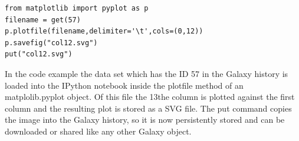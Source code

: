 \documentclass{bioinfo}
\begin{document}
\begin{methods}
\begin{lstlisting}[frame=single]
from matplotlib import pyplot as p
filename = get(57)
p.plotfile(filename,delimiter='\t',cols=(0,12))
p.savefig("col12.svg")
put("col12.svg")
\end{lstlisting}
In the code example the data set which has the ID 57 in the Galaxy history is loaded into the IPython notebook inside the plotfile method of an matplolib.pyplot object. Of this file the 13the column is plotted against the first column and the resulting plot is stored as a SVG file. The put command copies the image into the Galaxy history, so it is now persistently stored and can be downloaded or shared like any other Galaxy object. 



%
%
%
%
%
%
%
%
%
%



\end{methods}
\end{document}
